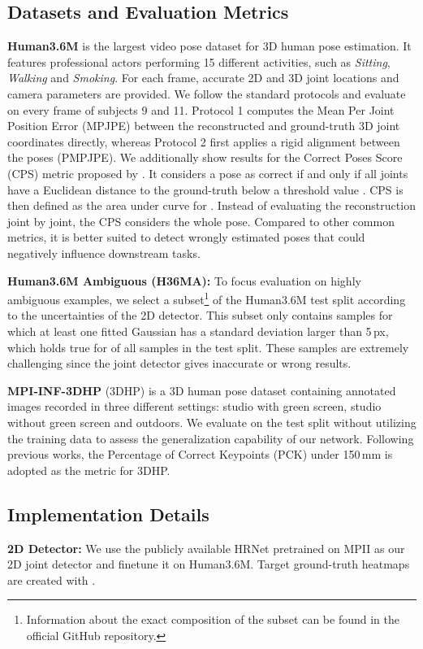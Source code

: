 \documentclass[10pt,twocolumn,letterpaper]{article}
\begin{document}
\subsection{Datasets and Evaluation Metrics}
\textbf{Human3.6M} \cite{h36m_pami} is the largest video pose dataset for 3D human pose estimation.
It features  professional actors performing 15 different activities, such as \textit{Sitting}, \textit{Walking} and \textit{Smoking}.
For each frame, accurate 2D and 3D joint locations and camera parameters are provided.
We follow the standard protocols and evaluate on every  frame of subjects 9 and 11.
Protocol 1 computes the Mean Per Joint Position Error (MPJPE) between the reconstructed and ground-truth 3D joint coordinates directly, whereas Protocol 2 first applies a rigid alignment between the poses (PMPJPE).
We additionally show results for the Correct Poses Score (CPS) metric proposed by \cite{WanRud2021a}.
It considers a pose as correct if and only if all joints have a Euclidean distance to the ground-truth below a threshold value . CPS is then defined as the area under curve for .
Instead of evaluating the reconstruction joint by joint, the CPS considers the whole pose.
Compared to other common metrics, it is better suited to detect wrongly estimated poses that could negatively influence downstream tasks.

\textbf{Human3.6M Ambiguous (H36MA):} To focus evaluation on highly ambiguous examples, we select a subset\footnote{Information about the exact composition of the subset can be found in the official GitHub repository.} of the Human3.6M test split according to the uncertainties of the 2D detector.
This subset only contains samples for which at least one fitted Gaussian has a standard deviation larger than 5\,px, which holds true for  of all samples in the test split.
These samples are extremely challenging since the joint detector gives inaccurate or wrong results.

\textbf{MPI-INF-3DHP} (3DHP) \cite{mono-3dhp2017} is a 3D human pose dataset containing annotated images recorded in three different settings: studio with green screen, studio without green screen and outdoors.
We evaluate on the test split without utilizing the training data to assess the generalization capability of our network.
Following previous works, the Percentage of Correct Keypoints (PCK) under 150\,mm is adopted as the metric for 3DHP.


\subsection{Implementation Details}
\textbf{2D Detector:} We use the publicly available HRNet \cite{Sun_2019_CVPR} pretrained on MPII \cite{andriluka14cvpr} as our 2D joint detector and finetune it on Human3.6M. Target ground-truth heatmaps are created with .
\end{document}
